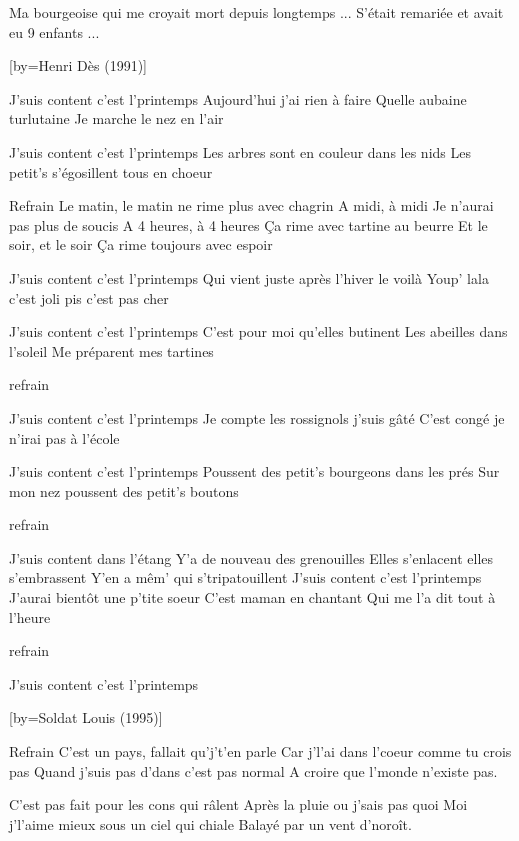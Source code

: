\beginverse
Ma bourgeoise qui me croyait mort depuis longtemps ...
S'était remariée et avait eu 9 enfants ...
\endverse

[by={Henri Dès (1991)}]

\beginverse
J'suis content c'est l'printemps
Aujourd'hui j'ai rien à faire
Quelle aubaine turlutaine
Je marche le nez en l'air
\endverse

\beginverse
J'suis content c'est l'printemps
Les arbres sont en couleur dans les nids
Les petit's s'égosillent tous en choeur
\endverse

	Refrain
Le matin, le matin ne rime plus avec chagrin
A midi, à midi
Je n'aurai pas plus de soucis
A 4 heures, à 4 heures
Ça rime avec tartine au beurre
Et le soir, et le soir
Ça rime toujours avec espoir

\beginverse
J'suis content c'est l'printemps
Qui vient juste après l'hiver le voilà
Youp' lala c'est joli pis c'est pas cher
\endverse

\beginverse
J'suis content c'est l'printemps
C'est pour moi qu'elles butinent
Les abeilles dans l'soleil
Me préparent mes tartines
\endverse

	 refrain

\beginverse
J'suis content c'est l'printemps
Je compte les rossignols j'suis gâté
C'est congé je n'irai pas à l'école
\endverse

\beginverse
J'suis content c'est l'printemps
Poussent des petit's bourgeons dans les prés
Sur mon nez poussent des petit's boutons
\endverse

	refrain

\beginverse
J'suis content dans l'étang
Y'a de nouveau des grenouilles
Elles s'enlacent elles s'embrassent
Y'en a mêm' qui s'tripatouillent
J'suis content c'est l'printemps
J'aurai bientôt une p'tite soeur
C'est maman en chantant
Qui me l'a dit tout à l'heure
\endverse

	refrain

\beginverse
J'suis content c'est l'printemps
\endverse

[by={Soldat Louis (1995)}]

	Refrain
C'est un pays, fallait qu'j't'en parle
Car j'l'ai dans l'coeur comme tu crois pas
Quand j'suis pas d'dans c'est pas normal
A croire que l'monde n'existe pas.

\beginverse
C'est pas fait pour les cons qui râlent
Après la pluie ou j'sais pas quoi
Moi j'l'aime mieux sous un ciel qui chiale
Balayé par un vent d'noroît.
\endverse

